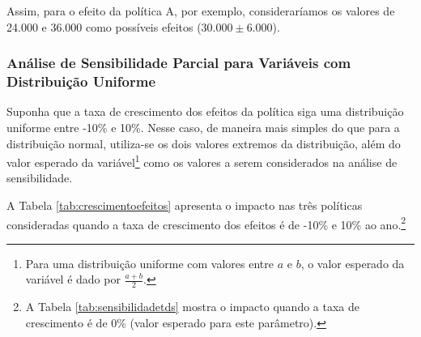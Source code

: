 \documentclass[12pt,letterpaper]{article}
\newcommand{\1}{\mathbbm{1}}
\numberwithin{equation}{section}
\begin{document}
Assim, para o efeito da política A, por exemplo, consideraríamos os valores de 24.000 e 36.000 como possíveis efeitos ($30.000 \pm 6.000$).

\subsubsection{Análise de Sensibilidade Parcial para Variáveis com Distribuição Uniforme}

Suponha que a taxa de crescimento dos efeitos da política siga uma distribuição uniforme entre -10\% e 10\%. Nesse caso, de maneira mais simples do que para a distribuição normal, utiliza-se os dois valores extremos da distribuição, além do valor esperado da variável\footnote{Para uma distribuição uniforme com valores entre $a$ e $b$, o valor esperado da variável é dado por $\frac{a+b}{2}$.} como os valores a serem considerados na análise de sensibilidade.

A Tabela \ref{tab:crescimentoefeitos} apresenta o impacto nas três políticas consideradas quando a taxa de crescimento dos efeitos é de -10\% e 10\% ao ano.\footnote{A Tabela \ref{tab:sensibilidadetds} mostra o impacto quando a taxa de crescimento é de 0\% (valor esperado para este parâmetro).}
\end{document}
